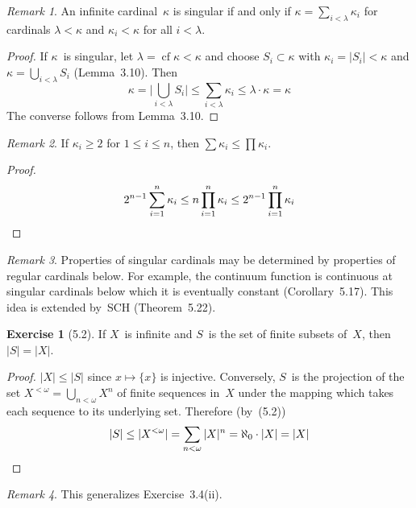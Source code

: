 \documentclass[letterpaper,12pt]{article}
\newcommand{\al}{\aleph}
\newcommand{\bigunion}{\bigcup}
\newcommand{\mult}{\cdot}
\DeclareMathOperator{\cf}{cf}
\newcommand{\card}[1]{|#1|}
\newcommand{\bigcard}[1]{\bigl|#1\bigr|}
\theoremstyle{definition}
\newtheorem*{exer}{Exercise}
\theoremstyle{remark}
\newtheorem*{rmk}{Remark}
\begin{document}
\begin{rmk}
An infinite cardinal~\(\kappa\) is singular if and only if \(\kappa=\sum_{i<\lambda}\kappa_i\) for cardinals \(\lambda<\kappa\) and \(\kappa_i<\kappa\) for all \(i<\lambda\).
\end{rmk}
\begin{proof}
If \(\kappa\)~is singular, let \(\lambda=\cf\kappa<\kappa\) and choose \(S_i\subset\kappa\) with \(\kappa_i=\card{S_i}<\kappa\) and \(\kappa=\bigunion_{i<\lambda}S_i\) (Lemma~3.10). Then
\[\kappa=\bigcard{\bigunion_{i<\lambda}S_i}\le\sum_{i<\lambda}\kappa_i\le\lambda\mult\kappa=\kappa\]
The converse follows from Lemma~3.10.
\end{proof}

\begin{rmk}
If \(\kappa_i\ge 2\) for \(1\le i\le n\), then \(\sum\kappa_i\le\prod\kappa_i\).
\end{rmk}
\begin{proof}
\[2^{n-1}\sum_{i=1}^n\kappa_i\le n\prod_{i=1}^n\kappa_i\le 2^{n-1}\prod_{i=1}^n\kappa_i\qedhere\]
\end{proof}

\begin{rmk}
Properties of singular cardinals may be determined by properties of regular cardinals below. For example, the continuum function is continuous at singular cardinals below which it is eventually constant (Corollary~5.17). This idea is extended by~SCH (Theorem~5.22).
\end{rmk}

\begin{exer}[5.2]
If \(X\)~is infinite and \(S\)~is the set of finite subsets of~\(X\), then \(\card{S}=\card{X}\).
\end{exer}
\begin{proof}
\(\card{X}\le\card{S}\) since \(x\mapsto\{x\}\) is injective. Conversely, \(S\)~is the projection of the set \(X^{<\omega}=\bigunion_{n<\omega}X^n\) of finite sequences in~\(X\) under the mapping which takes each sequence to its underlying set. Therefore (by~(5.2))
\[\card{S}\le\card{X^{<\omega}}=\sum_{n<\omega}\card{X}^n=\al_0\mult\card{X}=\card{X}\qedhere\]
\end{proof}
\begin{rmk}
This generalizes Exercise~3.4(ii).
\end{rmk}
\end{document}
